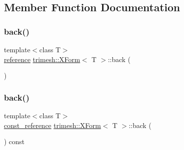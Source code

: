 \subsection{Member Function Documentation}
\mbox{\label{classtrimesh_1_1XForm_a2ed0156ff25334374691176aeb1fe6d5}} 
\subsubsection{\texorpdfstring{back()}{back()}\hspace{0.1cm}{\footnotesize\ttfamily [1/2]}}
{\footnotesize\ttfamily template$<$class T$>$ \\
\hyperlink{classtrimesh_1_1XForm_afef5285ff7d9ea2e25a4bb4d966bd674}{reference} \hyperlink{classtrimesh_1_1XForm}{trimesh\+::\+X\+Form}$<$ T $>$\+::back (\begin{DoxyParamCaption}{ }\end{DoxyParamCaption})\hspace{0.3cm}{\ttfamily [inline]}}

\mbox{\label{classtrimesh_1_1XForm_aa2b191381274a21eaf1a835f36f0043f}} 
\subsubsection{\texorpdfstring{back()}{back()}\hspace{0.1cm}{\footnotesize\ttfamily [2/2]}}
{\footnotesize\ttfamily template$<$class T$>$ \\
\hyperlink{classtrimesh_1_1XForm_a33bd450d8902f70aaf7d4bf9fec01502}{const\+\_\+reference} \hyperlink{classtrimesh_1_1XForm}{trimesh\+::\+X\+Form}$<$ T $>$\+::back (\begin{DoxyParamCaption}{ }\end{DoxyParamCaption}) const\hspace{0.3cm}{\ttfamily [inline]}}

\mbox{\label{classtrimesh_1_1XForm_ae1f0dbbd390cf148f7fe35cc47172a13}} 
